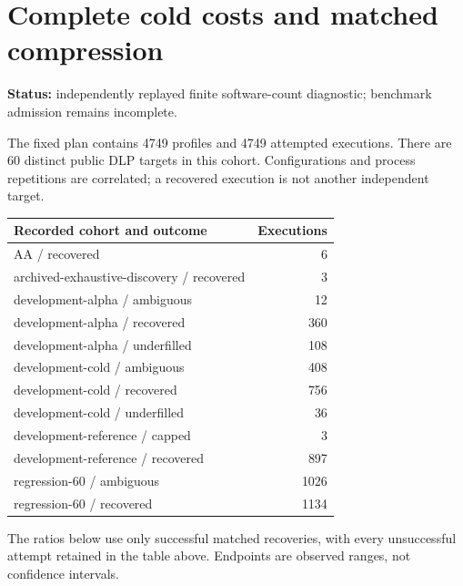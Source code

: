 \documentclass[
  10pt,
]{article}
\author{}
\date{}
\begin{document}
\section{Complete cold costs and matched
compression}\label{complete-cold-costs-and-matched-compression}

\textbf{Status:} independently replayed finite software-count
diagnostic; benchmark admission remains incomplete.

The fixed plan contains 4749 profiles and 4749 attempted executions.
There are 60 distinct public DLP targets in this cohort. Configurations
and process repetitions are correlated; a recovered execution is not
another independent target.

\begin{longtable}[]{@{}lr@{}}
\toprule\noalign{}
Recorded cohort and outcome & Executions \\
\midrule\noalign{}
\endhead
\bottomrule\noalign{}
\endlastfoot
AA / recovered & 6 \\
archived-exhaustive-discovery / recovered & 3 \\
development-alpha / ambiguous & 12 \\
development-alpha / recovered & 360 \\
development-alpha / underfilled & 108 \\
development-cold / ambiguous & 408 \\
development-cold / recovered & 756 \\
development-cold / underfilled & 36 \\
development-reference / capped & 3 \\
development-reference / recovered & 897 \\
regression-60 / ambiguous & 1026 \\
regression-60 / recovered & 1134 \\
\end{longtable}

The ratios below use only successful matched recoveries, with every
unsuccessful attempt retained in the table above. Endpoints are observed
ranges, not confidence intervals.
\end{document}
